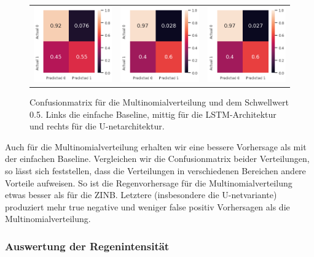 \begin{figure}[h]
\begin{tabular}{ccc}
\includegraphics[width=45mm]{abb/simpleBaseLine.png}&
\includegraphics[width=45mm]{abb/categoricalConfusion_LSTM.png}&
\includegraphics[width=45mm]{abb/categoricalConfusion_UNET.png}
\end{tabular}
\caption{Confusionmatrix für die Multinomialverteilung und dem Schwellwert 0.5. Links die einfache Baseline, mittig für die LSTM-Architektur und rechts für die U-netarchitektur. \label{fig:confusionmatrix_cat}}
\end{figure}

\noindent Auch für die Multinomialverteilung erhalten wir eine bessere Vorhersage als mit der einfachen Baseline.
Vergleichen wir die Confusionmatrix beider Verteilungen, so lässt sich feststellen, dass die Verteilungen in verschiedenen Bereichen andere Vorteile aufweisen.
So ist die Regenvorhersage für die Multinomialverteilung etwas besser als für die ZINB. Letztere (insbesondere die U-netvariante) produziert mehr true negative und weniger false positiv Vorhersagen als die Multinomialverteilung.

\subsubsection{Auswertung der Regenintensität}

